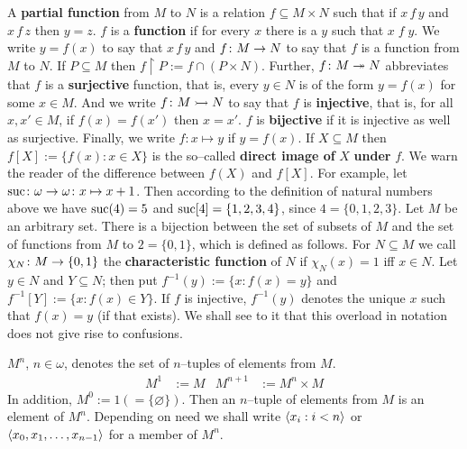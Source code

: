 A \textbf{partial function} from $M$ to $N$ is a relation $f \subseteq
M \times N$ such that if $x \, f \, y$ and $x \, f \, z$
then $y = z$. $f$ is a \textbf{function} if for every $x$ there is a 
$y$ such that $x\; f\; y$. We write $y = f(x)$ to say that $x\, f\, y$
and $f \colon M \rightarrow N$ to say that $f$ is a function from $M$ to
$N$. If $P \subseteq M$ then $f \restriction P :=
f \cap (P \times N)$.
Further, $f \colon M \twoheadrightarrow N$ abbreviates that $f$ is a
\index{$\epi$, $\mono$}%
\textbf{surjective} function, that is, every $y \in N$ is of
the form $y = f(x)$ for some $x \in M$. And we write
$f \colon M \rightarrowtail N$ to say that $f$ is \textbf{injective}, that is,
for all $x, x' \in M$, if $f(x) = f(x')$ then $x = x'$.
$f$ is \textbf{bijective} if it is injective as well as surjective.
Finally, we write $f \colon x \mapsto y$ if $y = f(x)$. If
$X \subseteq M$ then $f[X] := \{f(x) : x \in X\}$ is the
so--called \textbf{direct image of} $X$ \textbf{under}
$f$. We warn the reader of the difference between
$f(X)$ and $f[X]$. For example, let
$\operatorname{suc} \colon \omega \rightarrow \omega \colon x \mapsto x + 1$. Then
according to the definition of natural numbers above
we have $\operatorname{suc}(4) = 5$ and $\operatorname{suc}[4] = \{1,2,3,4\}$, since
$4 = \{0,1,2,3\}$. Let $M$ be an arbitrary set. There
is a bijection between the set of subsets of $M$ and the 
set of functions from $M$ to $2 = \{0,1\}$, which is defined 
as follows.  For $N \subseteq M$ we call $\chi_N \colon M \rightarrow \{0,1\}$ 
the \textbf{characteristic function}
of $N$ if $\chi_N(x) = 1$ iff $x \in N$.
Let $y \in N$ and $Y \subseteq N$; then put
$f^{-1}(y) := \{x : f(x) = y\}$ and
$f^{-1}[Y]  := \{x : f(x) \in Y\}$. If $f$ is injective,
$f^{-1}(y)$ denotes the unique $x$ such that $f(x) = y$
(if that exists). We shall see to it that this overload
in notation does not give rise to confusions.

$M^n$, $n \in \omega$, denotes the set of $n$--tuples
of elements from $M$. 
\begin{align}
M^1     & := M & M^{n+1} & := M^n \times M
\end{align}
In addition, $M^0 := 1 (= \{\varnothing\})$.
Then an $n$--tuple of elements from $M$ is an element of
$M^n$. Depending on need we shall write
$\langle x_i : i < n\rangle$ or $\langle x_0, x_1, \dotsc, x_{n-1}\rangle$
for a member of $M^n$.

